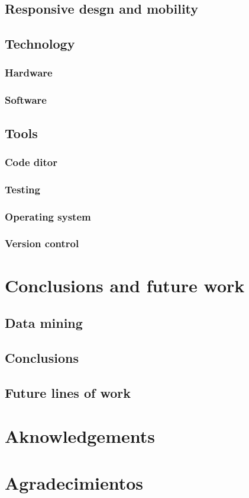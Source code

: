 \documentclass{DeustoFDP}
\begin{document}
\section{Responsive desgn and mobility}
\section{Technology}
\subsection{Hardware}
\subsection{Software}
\section{Tools}
\subsection{Code ditor}
\subsection{Testing}
\subsection{Operating system}
\subsection{Version control}

\chapter{Conclusions and future work}
\section{Data mining}
\section{Conclusions}
\section{Future lines of work}

\chapter{Aknowledgements}

\chapter{Agradecimientos}

\printbibliography[heading=bibintoc]

\appendix

\backmatter
\end{document}
